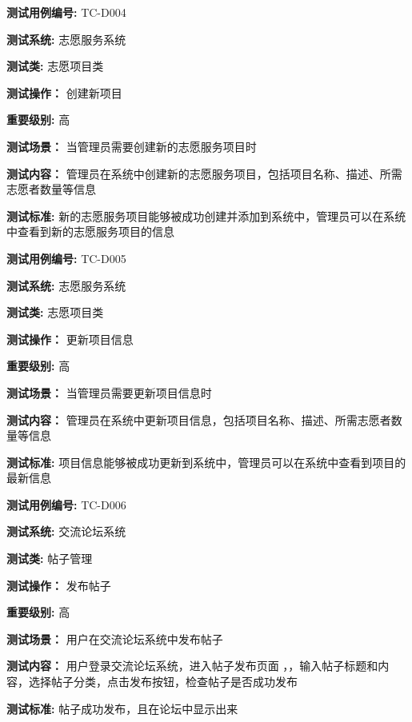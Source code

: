 \begin{framed} \textbf{测试用例编号:} TC-D004

\textbf{测试系统:} 志愿服务系统

\textbf{测试类: } 志愿项目类

\textbf{测试操作：} 创建新项目

\textbf{重要级别:} 高

\textbf{测试场景：} 当管理员需要创建新的志愿服务项目时

\textbf{测试内容：} 管理员在系统中创建新的志愿服务项目，包括项目名称、描述、所需志愿者数量等信息

\textbf{测试标准:} 新的志愿服务项目能够被成功创建并添加到系统中，管理员可以在系统中查看到新的志愿服务项目的信息

\begin{center}  \end{center} \end{framed}

\begin{framed} \textbf{测试用例编号:} TC-D005

\textbf{测试系统:} 志愿服务系统

\textbf{测试类: } 志愿项目类

\textbf{测试操作：} 更新项目信息

\textbf{重要级别:} 高

\textbf{测试场景：} 当管理员需要更新项目信息时

\textbf{测试内容：} 管理员在系统中更新项目信息，包括项目名称、描述、所需志愿者数量等信息

\textbf{测试标准:} 项目信息能够被成功更新到系统中，管理员可以在系统中查看到项目的最新信息

\begin{center}  \end{center} \end{framed}

 \begin{framed} \textbf{测试用例编号:} TC-D006

\textbf{测试系统:} 交流论坛系统

\textbf{测试类: } 帖子管理

\textbf{测试操作：} 发布帖子

\textbf{重要级别:} 高

\textbf{测试场景：} 用户在交流论坛系统中发布帖子

\textbf{测试内容：} 用户登录交流论坛系统，进入帖子发布页面 ，，输入帖子标题和内容，选择帖子分类，点击发布按钮，检查帖子是否成功发布

\textbf{测试标准:} 帖子成功发布，且在论坛中显示出来

\begin{center}  \end{center} \end{framed}

